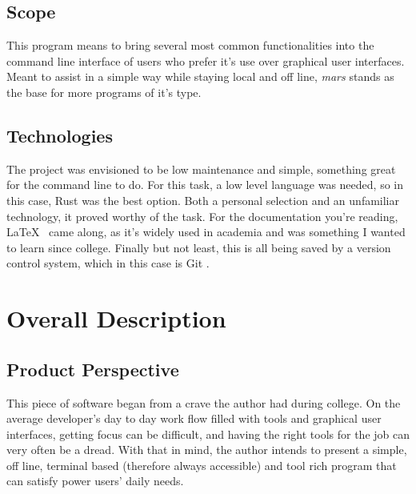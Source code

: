 \documentclass{report}
\begin{document}
\section{Scope}
This program means to bring several most common functionalities into the command line interface of users who prefer it's use over graphical user interfaces. Meant to assist in a simple way while staying local and off line, \emph{mars} stands as the base for more programs of it's type.

\section{Technologies}
The project was envisioned to be low maintenance and simple, something great for the command line to do. For this task, a low level language was needed, so in this case, Rust \cite{RustProgrammingLanguage} was the best option. Both a personal selection and an unfamiliar technology, it proved worthy of the task. For the documentation you're reading, \LaTeX\ \cite{LaTeXDocumentPreparation} came along, as it's widely used in academia and was something I wanted to learn since college. Finally but not least, this is all being saved by a version control system, which in this case is Git \cite{Git}.

\chapter{Overall Description}
\section{Product Perspective}
This piece of software began from a crave the author had during college. On the average developer's day to day work flow filled with tools and graphical user interfaces, getting focus can be difficult, and having the right tools for the job can very often be a dread. With that in mind, the author intends to present a simple, off line, terminal based (therefore always accessible) and tool rich program that can satisfy power users' daily needs.
\end{document}
